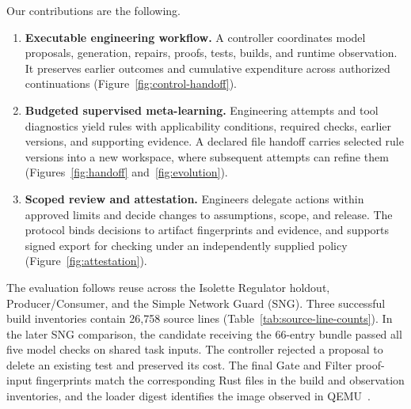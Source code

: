 Our contributions are the following.
\begin{enumerate}
\item \textbf{Executable engineering workflow.} A controller coordinates model proposals, generation, repairs, proofs, tests, builds, and runtime observation. It preserves earlier outcomes and cumulative expenditure across authorized continuations (Figure~\ref{fig:control-handoff}).
\item \textbf{Budgeted supervised meta-learning.} Engineering attempts and tool diagnostics yield rules with applicability conditions, required checks, earlier versions, and supporting evidence. A declared file handoff carries selected rule versions into a new workspace, where subsequent attempts can refine them (Figures~\ref{fig:handoff} and~\ref{fig:evolution}).
\item \textbf{Scoped review and attestation.} Engineers delegate actions within approved limits and decide changes to assumptions, scope, and release. The protocol binds decisions to artifact fingerprints and evidence, and supports signed export for checking under an independently supplied policy (Figure~\ref{fig:attestation}).
\end{enumerate}

The evaluation follows reuse across the Isolette Regulator holdout, Producer/\allowbreak{}Consumer, and the Simple Network Guard (SNG). Three successful build inventories contain 26,758 source lines (Table~\ref{tab:source-line-counts}). In the later SNG comparison, the candidate receiving the 66-entry bundle passed all five model checks on shared task inputs. The controller rejected a proposal to delete an existing test and preserved its cost. The final Gate and Filter proof-input fingerprints match the corresponding Rust files in the build and observation inventories, and the loader digest identifies the image observed in QEMU~\cite{sngFinalReport2026}.
